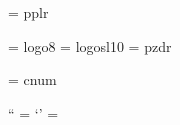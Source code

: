 
%
\font\tenpal = pplr

%
\font\eightlogo = logo8
\font\logosl = logosl10
\font\handfont = pzdr

\ifmsdos
   \font\cnum = cnum %
   \let\chapternumeralfont = \cnum
\fi

\def\undefinedfont{\errmessage{Undefined font}}

%
\def\clearfonts{\let\rm = \undefinedfont \let\bf = \undefinedfont
   \let\it = \undefinedfont \let\bi = \undefinedfont
   \let\tt = \undefinedfont \let\bt = \undefinedfont
   \let\sc = \undefinedfont
   \let\ss = \undefinedfont
}

%
\def\bi{\tenbi}

\def\mapquotes{\catcode`` = \active \catcode`' = \active}
{\mapquotes
  \gdef\bt{%
     \tenbt
     \def\\{{\tentt \char92}}%
     \def`{{\tentt \char96}}\def'{{\tentt \char39}}%
  }
}

\def\bti{\tenbi}
\def\sc{\tensc}

%
\def\textfonts{%
  \def\rm{\fam0\tenrm}%
  \textfont0=\tenrm \scriptfont0=\sevenrm \scriptscriptfont0=\fiverm
  \textfont1=\teni \scriptfont1=\seveni \scriptscriptfont1=\fivei
  \textfont2=\tensy \scriptfont2=\sevensy \scriptscriptfont2=\fivesy
  \textfont3=\tenex \scriptfont3=\tenex \scriptscriptfont3=\tenex
  \def\it{\fam\itfam\tenit}\textfont\itfam=\tenit
  \def\sl{\fam\slfam\tensl}\textfont\slfam=\tensl
  \def\bf{\fam\bffam\tenbf}\textfont\bffam=\tenbf
  \scriptfont\bffam=\sevenbf \scriptscriptfont\bffam=\fivebf
  \def\tt{\fam\ttfam\tentt}\textfont\ttfam=\tentt
  \let\sc = \tensc
  \setbox\strutbox=\hbox{\vrule height8.5pt depth3.5pt width\z@}%
  \normalbaselineskip=12pt
  \normalbaselines \rm
}


